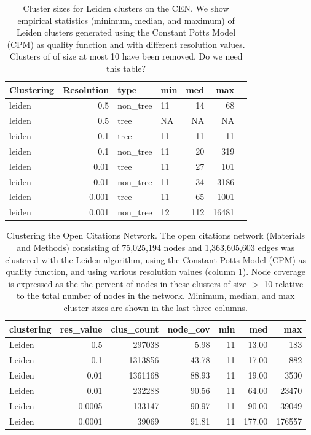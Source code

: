 \documentclass[12pt, oneside]{article}   	%
\begin{document}
\begin{table}[ht]
\centering
\begin{tabular}{lrllrrr}
  \hline
 Clustering & Resolution & type & min & med & max \\ 
  \hline
leiden & 0.5 & non\_tree &  11 & 14 &  68 \\ 
leiden & 0.5 & tree &  NA & NA &  NA \\ 
leiden & 0.1 & tree &  11 & 11 &  11 \\ 
leiden  & 0.1 & non\_tree &  11 & 20 & 319 \\ 
leiden  & 0.01 & tree &  11 & 27 & 101 \\ 
leiden & 0.01 & non\_tree &  11 & 34 & 3186 \\ 
leiden & 0.001 & tree &  11 & 65 & 1001 \\ 
leiden & 0.001 & non\_tree &  12 & 112 & 16481 \\ 

   \hline
\end{tabular}
\caption{Cluster sizes for Leiden clusters on the CEN. We show empirical statistics (minimum, median, and maximum) of Leiden clusters generated using the Constant Potts Model (CPM) as quality function and with different resolution values. Clusters of of size at most 10 have been removed. Do we need this table?}
\end{table}

\begin{table}[ht]
\centering
\begin{tabular}{lrrrrrr}
  \hline
 clustering & res\_value & clus\_count & node\_cov & min & med & max \\ 
  \hline
Leiden & 0.5 & 297038 & 5.98 &  11 & 13.00 & 183 \\ 
Leiden & 0.1 & 1313856 & 43.78 &  11 & 17.00 & 882 \\ 
Leiden & 0.01 & 1361168 & 88.93 &  11 & 19.00 & 3530 \\ 
Leiden & 0.01 & 232288 & 90.56 &  11 & 64.00 & 23470 \\ 
Leiden & 0.0005 & 133147 & 90.97 &  11 & 90.00 & 39049 \\  
Leiden & 0.0001 & 39069 & 91.81 &  11 & 177.00 & 176557 \\ 
   \hline
\end{tabular}
\caption{Clustering the Open Citations Network. The open citations network (Materials and Methods) consisting of 75,025,194 nodes and 1,363,605,603 edges was clustered with the Leiden algorithm, using the Constant Potts Model (CPM) as quality function, and using various resolution values (column 1). Node coverage is expressed as the the percent of nodes in these clusters of size $>$ 10 relative to the total number of nodes in the network. Minimum, median, and max cluster sizes are shown in the last three columns.  }
\end{table}
\end{document}
